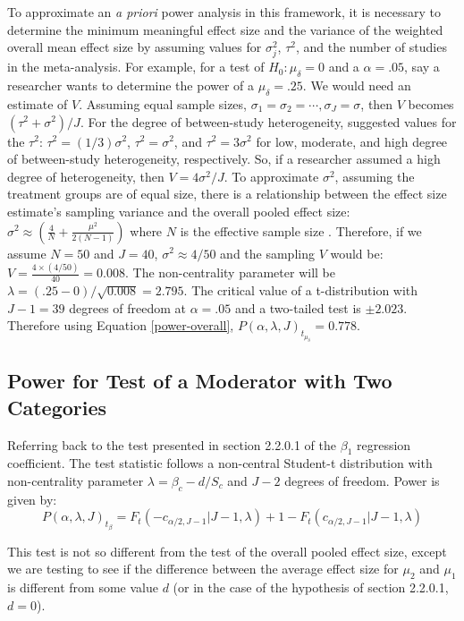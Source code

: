 To approximate an \textit{a priori} power analysis in this framework, it is necessary to determine the minimum meaningful effect size and the variance of the weighted overall mean effect size by assuming values for $\sigma_j^2$,  $\tau^2$, and the number of studies in the meta-analysis. For example, for a test of $H_0: \mu_{\delta} = 0$ and a $\alpha = .05$, say a researcher wants to determine the power of a $\mu_{\delta} = .25$. We would need an estimate of $V$. Assuming equal sample sizes, $\sigma_1 = \sigma_2 = \cdots, \sigma_J = \sigma$, then $V$ becomes $(\tau^2 +\sigma^2)/J$. For the degree of between-study heterogeneity, \textcite{pigott2012} suggested values for the $\tau^2$: $\tau^2 = (1/3)\sigma^2$, $\tau^2 = \sigma^2$, and $\tau^2 = 3\sigma^2$ for low, moderate, and high degree of between-study heterogeneity, respectively.  So, if a researcher assumed a high degree of heterogeneity, then $V= 4\sigma^2/J$. To approximate $\sigma^2$, assuming the treatment groups are of equal size, there is a relationship between the effect size estimate's sampling variance and the overall pooled effect size: $\sigma^2 \approx (\frac{4}{N} + \frac{\mu^2}{2(N-1)})$ where $N$ is the effective sample size \autocite{valentine2010}. Therefore, if we assume  $N = 50$ and $J= 40$, $\sigma^2 \approx 4/50$ and the sampling $V$ would be: $V = \frac{4 \times (4/50)}{40} = 0.008$. The non-centrality parameter will be $\lambda = (.25 - 0)/ \sqrt{0.008} = 2.795$. The critical value of a t-distribution with $J-1 = 39$ degrees of freedom at $\alpha=.05$ and a two-tailed test is $ \pm 2.023$. Therefore using Equation \ref{power-overall}, $P(\alpha, \lambda, J)_{t_{\mu_{\delta}}} = 0.778$.
 

\subsection{Power for Test of a Moderator with Two Categories}
Referring back to the test presented in section 2.2.0.1 of the $\beta_1$ regression coefficient. The test statistic follows a non-central Student-t distribution with non-centrality parameter $\lambda =  \beta_c - d /  S_c$ and $J-2$ degrees of freedom. Power is given by:
\begin{equation}
   P(\alpha, \lambda, J)_{t_{\beta}} =  F_t(-c_{\alpha/2,J-1}|J-1,\lambda) + 1- F_t(c_{\alpha/2,J-1}|J-1,\lambda)
\end{equation}

This test is not so different from the test of the overall pooled effect size, except we are testing to see if the difference between the average effect size for $\mu_2$ and $\mu_1$ is different from some value $d$ (or in the case of the hypothesis of section 2.2.0.1,  $d= 0$).

